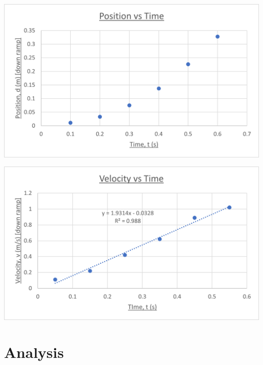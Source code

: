 \documentclass{article}
\begin{document}
\includegraphics{pos-time}

\includegraphics{vel-time}

\section*{Analysis}
\end{document}
